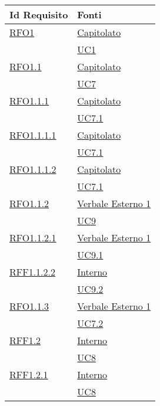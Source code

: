 \normalsize
\begin{longtable}{|>{\centering}m{5cm}|m{5cm}<{\centering}|}
\hline
\textbf{Id Requisito} & \textbf{Fonti}\\
\hline
\endhead
\hyperlink{RFO1}{RFO1} & \hyperlink{Capitolato}{Capitolato}\\
& \hyperref[UC1]{UC1}\\ \hline

\hyperlink{RFO1.1}{RFO1.1} & \hyperlink{Capitolato}{Capitolato}\\
& \hyperref[UC7]{UC7}\\ \hline

\hyperlink{RFO1.1.1}{RFO1.1.1} & \hyperlink{Capitolato}{Capitolato}\\
& \hyperref[UC7.1]{UC7.1}\\ \hline

\hyperlink{RFO1.1.1.1}{RFO1.1.1.1} & \hyperlink{Capitolato}{Capitolato}\\
& \hyperref[UC7.1]{UC7.1}\\ \hline

\hyperlink{RFO1.1.1.2}{RFO1.1.1.2} & \hyperlink{Capitolato}{Capitolato}\\
& \hyperref[UC7.1]{UC7.1}\\ \hline

\hyperlink{RFO1.1.2}{RFO1.1.2} & \hyperlink{Verbale Esterno 1}{Verbale Esterno 1}\\
& \hyperref[UC9]{UC9}\\ \hline

\hyperlink{RFO1.1.2.1}{RFO1.1.2.1} & \hyperlink{Verbale Esterno 1}{Verbale Esterno 1}\\
& \hyperref[UC9.1]{UC9.1}\\ \hline

\hyperlink{RFF1.1.2.2}{RFF1.1.2.2} & \hyperlink{Interno}{Interno}\\
& \hyperref[UC9.2]{UC9.2}\\ \hline

\hyperlink{RFO1.1.3}{RFO1.1.3} & \hyperlink{Verbale Esterno 1}{Verbale Esterno 1}\\
& \hyperref[UC7.2]{UC7.2}\\ \hline

\hyperlink{RFF1.2}{RFF1.2} & \hyperlink{Interno}{Interno}\\
& \hyperref[UC8]{UC8}\\ \hline

\hyperlink{RFF1.2.1}{RFF1.2.1} & \hyperlink{Interno}{Interno}\\
& \hyperref[UC8]{UC8}\\ \hline


\end{longtable}
